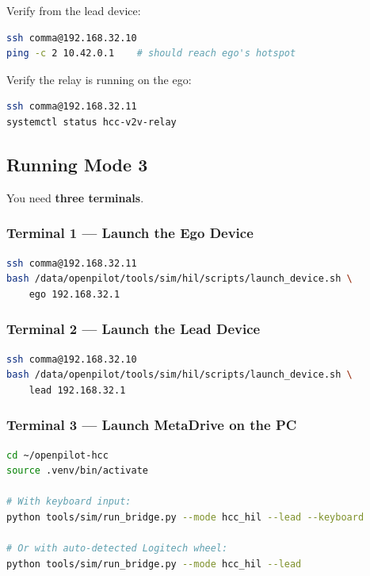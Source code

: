 \documentclass[11pt, letterpaper]{article}
\begin{document}
Verify from the lead device:

\begin{lstlisting}[language=bash]
ssh comma@192.168.32.10
ping -c 2 10.42.0.1    # should reach ego's hotspot
\end{lstlisting}

Verify the relay is running on the ego:

\begin{lstlisting}[language=bash]
ssh comma@192.168.32.11
systemctl status hcc-v2v-relay
\end{lstlisting}

\subsection{Running Mode 3}

You need \textbf{three terminals}.

\subsubsection{Terminal 1 --- Launch the Ego Device}

\begin{lstlisting}[language=bash]
ssh comma@192.168.32.11
bash /data/openpilot/tools/sim/hil/scripts/launch_device.sh \
    ego 192.168.32.1
\end{lstlisting}

\subsubsection{Terminal 2 --- Launch the Lead Device}

\begin{lstlisting}[language=bash]
ssh comma@192.168.32.10
bash /data/openpilot/tools/sim/hil/scripts/launch_device.sh \
    lead 192.168.32.1
\end{lstlisting}

\subsubsection{Terminal 3 --- Launch MetaDrive on the PC}

\begin{lstlisting}[language=bash]
cd ~/openpilot-hcc
source .venv/bin/activate

# With keyboard input:
python tools/sim/run_bridge.py --mode hcc_hil --lead --keyboard

# Or with auto-detected Logitech wheel:
python tools/sim/run_bridge.py --mode hcc_hil --lead
\end{lstlisting}
\end{document}
